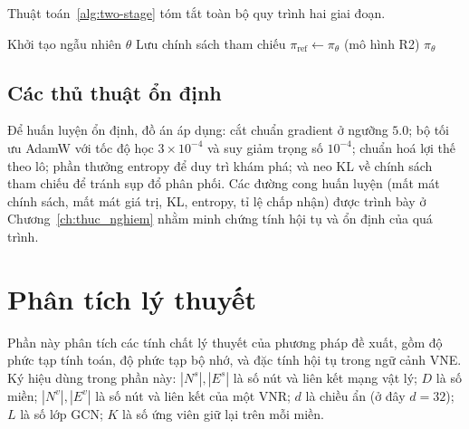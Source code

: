 \documentclass[../DoAn.tex]{subfiles}
\begin{document}
Thuật toán~\ref{alg:two-stage} tóm tắt toàn bộ quy trình hai giai đoạn.

\begin{algorithm}[H]
\caption{Huấn luyện hai giai đoạn của CARL-VNE}
\label{alg:two-stage}
\SetAlgoLined
{}
Khởi tạo ngẫu nhiên $\theta$\;
Lưu chính sách tham chiếu $\pi_{\text{ref}} \leftarrow \pi_\theta$ (mô hình R2)\;
\Return $\pi_\theta$\;
\end{algorithm}

\subsection{Các thủ thuật ổn định}
\label{subsec:train-stable}

Để huấn luyện ổn định, đồ án áp dụng: cắt chuẩn gradient ở ngưỡng $5.0$; bộ tối ưu AdamW với tốc độ học $3\times10^{-4}$ và suy giảm trọng số $10^{-4}$; chuẩn hoá lợi thế theo lô; phần thưởng entropy để duy trì khám phá; và neo KL về chính sách tham chiếu để tránh sụp đổ phân phối. Các đường cong huấn luyện (mất mát chính sách, mất mát giá trị, KL, entropy, tỉ lệ chấp nhận) được trình bày ở Chương~\ref{ch:thuc_nghiem} nhằm minh chứng tính hội tụ và ổn định của quá trình.

\section{Phân tích lý thuyết}             %
\label{sec:analysis}

Phần này phân tích các tính chất lý thuyết của phương pháp đề xuất, gồm độ phức tạp tính toán, độ phức tạp bộ nhớ, và đặc tính hội tụ trong ngữ cảnh VNE. Ký hiệu dùng trong phần này: $|N^s|, |E^s|$ là số nút và liên kết mạng vật lý; $D$ là số miền; $|N^v|, |E^v|$ là số nút và liên kết của một VNR; $d$ là chiều ẩn (ở đây $d=32$); $L$ là số lớp GCN; $K$ là số ứng viên giữ lại trên mỗi miền.
\end{document}
